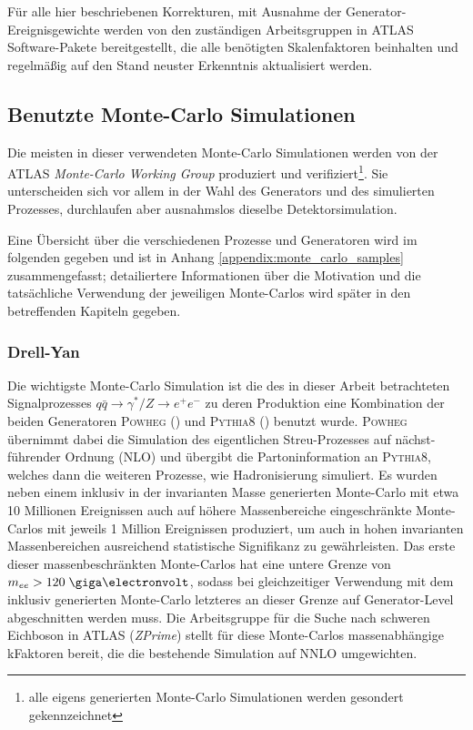 Für alle hier beschriebenen Korrekturen, mit Ausnahme der
Generator-Ereignisgewichte werden von den zuständigen Arbeitsgruppen in ATLAS
Software-Pakete bereitgestellt, die alle benötigten Skalenfaktoren beinhalten
und regelmäßig auf den Stand neuster Erkenntnis aktualisiert werden.



\subsection{Benutzte Monte-Carlo Simulationen}
\label{used_mc_samples}
Die meisten in dieser verwendeten Monte-Carlo Simulationen werden von der ATLAS
\textit{Monte-Carlo Working Group} produziert und verifiziert\footnote{alle
eigens generierten Monte-Carlo Simulationen werden gesondert gekennzeichnet}.
Sie unterscheiden sich vor allem in der Wahl des Generators und des simulierten
Prozesses, durchlaufen aber ausnahmslos dieselbe Detektorsimulation.

Eine Übersicht über die verschiedenen Prozesse und Generatoren wird im
folgenden gegeben und ist in Anhang \ref{appendix:monte_carlo_samples}
zusammengefasst; detailiertere Informationen über die Motivation und die
tatsächliche Verwendung der jeweiligen Monte-Carlos wird später in den
betreffenden Kapiteln gegeben.

\subsubsection*{Drell-Yan}
Die wichtigste Monte-Carlo Simulation ist die des in dieser Arbeit betrachteten
Signalprozesses $q\bar q \rightarrow \gamma^*/Z \rightarrow e^+e^-$ zu deren
Produktion eine Kombination der beiden Generatoren \textsc{Powheg}
(\cite{Alioli:2010xd}) und \textsc{Pythia8} (\cite{Sjostrand:2007gs}) benutzt
wurde. \textsc{Powheg} übernimmt dabei die Simulation des eigentlichen
Streu-Prozesses auf nächst-führender Ordnung (NLO) und übergibt die
Partoninformation an \textsc{Pythia8}, welches dann die weiteren Prozesse, wie
Hadronisierung simuliert. Es wurden neben einem inklusiv in der invarianten
Masse generierten Monte-Carlo mit etwa 10 Millionen Ereignissen auch auf höhere
Massenbereiche eingeschränkte Monte-Carlos mit jeweils 1 Million Ereignissen
produziert, um auch in hohen invarianten Massenbereichen ausreichend
statistische Signifikanz zu gewährleisten. Das erste dieser massenbeschränkten
Monte-Carlos hat eine untere Grenze von $m_{ee} > 120 \GeV$, sodass bei
gleichzeitiger Verwendung mit dem inklusiv generierten Monte-Carlo letzteres an
dieser Grenze auf Generator-Level abgeschnitten werden muss. Die Arbeitsgruppe
für die Suche nach schweren Eichboson in ATLAS (\textit{ZPrime}) stellt für
diese Monte-Carlos massenabhängige kFaktoren bereit, die die bestehende
Simulation auf NNLO umgewichten.

